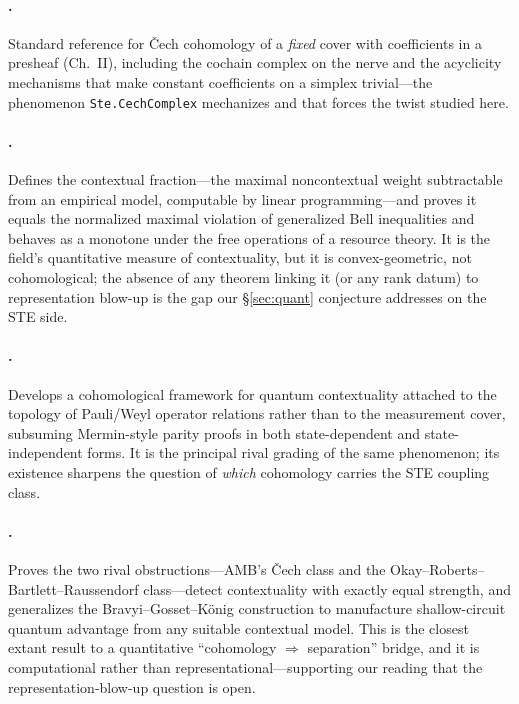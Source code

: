 \documentclass[11pt]{article}
\newcommand{\lean}[1]{\texttt{#1}}
\newcommand{\cech}{\v{C}ech}
\begin{document}
\paragraph{\citet{bott1982forms}.}
Standard reference for \cech{} cohomology of a \emph{fixed} cover with
coefficients in a presheaf (Ch.~II), including the cochain complex on
the nerve and the acyclicity mechanisms that make constant
coefficients on a simplex trivial---the phenomenon
\lean{Ste.CechComplex} mechanizes and that forces the twist studied
here.

\paragraph{\citet{abramsky2017contextualfraction}.}
Defines the contextual fraction---the maximal noncontextual weight
subtractable from an empirical model, computable by linear
programming---and proves it equals the normalized maximal violation of
generalized Bell inequalities and behaves as a monotone under the free
operations of a resource theory.  It is the field's quantitative
measure of contextuality, but it is convex-geometric, not
cohomological; the absence of any theorem linking it (or any rank
datum) to representation blow-up is the gap our
\S\ref{sec:quant} conjecture addresses on the STE side.

\paragraph{\citet{okay2017topological}.}
Develops a cohomological framework for quantum contextuality attached
to the topology of Pauli/Weyl operator relations rather than to the
measurement cover, subsuming Mermin-style parity proofs in both
state-dependent and state-independent forms.  It is the principal
rival grading of the same phenomenon; its existence sharpens the
question of \emph{which} cohomology carries the STE coupling class.

\paragraph{\citet{aasnaess2022comparing}.}
Proves the two rival obstructions---AMB's \cech{} class and the
Okay--Roberts--Bartlett--Raussendorf class---detect contextuality with
exactly equal strength, and generalizes the Bravyi--Gosset--K\"onig
construction to manufacture shallow-circuit quantum advantage from any
suitable contextual model.  This is the closest extant result to a
quantitative ``cohomology $\Rightarrow$ separation'' bridge, and it is
computational rather than representational---supporting our reading
that the representation-blow-up question is open.
\end{document}
